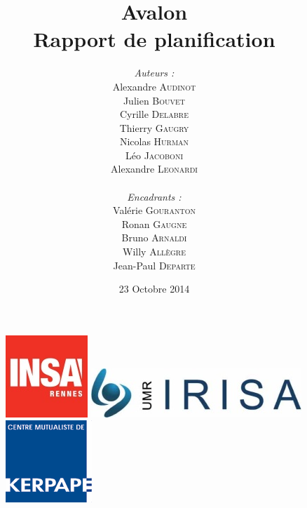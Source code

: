 \documentclass[a4paper,11pt]{article}
\title{
  \textbf{Avalon}\\
  Rapport de planification
}
\author{
\begin{minipage}{0.4\textwidth}
	\begin{flushleft} \large
		\emph{Auteurs :}\\
		Alexandre \textsc{Audinot}\\
		Julien \textsc{Bouvet}\\
		Cyrille \textsc{Delabre}\\
		Thierry \textsc{Gaugry}\\
		Nicolas \textsc{Hurman}\\
		Léo \textsc{Jacoboni}\\
		Alexandre \textsc{Leonardi}\\
	\end{flushleft}
\end{minipage}
\begin{minipage}{0.4\textwidth}
	\begin{flushright} \large
		\emph{Encadrants :} \\
		Valérie \textsc{Gouranton}\\
		Ronan \textsc{Gaugne}\\
		Bruno \textsc{Arnaldi}\\
		Willy \textsc{Allègre}\\
		Jean-Paul  \textsc{Departe}\\
	\end{flushright}
\end{minipage}
}
\date{23 Octobre 2014}
\begin{document}
\maketitle
\thispagestyle{empty}


\begin{figure}[h!]
   \begin{minipage}{0.3\linewidth}
      \includegraphics[scale=0.9]{3-Planification/img/logo_insa.jpeg}
   \end{minipage} 
   \begin{minipage}{0.2\linewidth}
      \centering
      \includegraphics[scale=0.5,left]{3-Planification/img/logo_irisa.jpg}
   \end{minipage}\hfill
   \begin{minipage}{0.2\linewidth}
      \includegraphics[scale=0.9]{3-Planification/img/logo_kerpape.png}
   \end{minipage}
\end{figure}

\pagebreak

\tableofcontents
\pagebreak


\pagebreak

\pagebreak

\pagebreak

\pagebreak

\pagebreak

\end{document}

